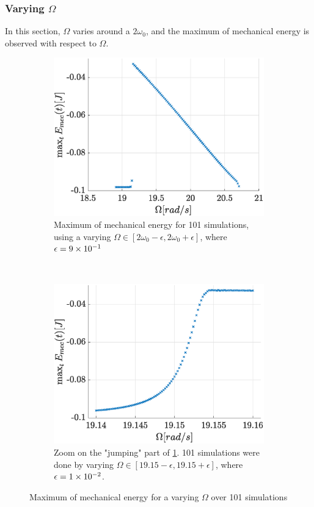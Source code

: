 \documentclass[a4paper,12pt,twoside]{article}
\begin{document}
\subsubsection{Varying $\Omega$}
In this section, $\Omega$ varies around a $2\omega_0$, and the maximum of mechanical energy is observed with respect to $\Omega$.

\begin{figure}[h]
	\begin{subfigure}[t]{0.49\textwidth}
		\includegraphics[width=\textwidth]{graphs/d_emax_full.eps}
		\caption{Maximum of mechanical energy for \num{101} simulations, using a varying $\Omega\in\left[2\omega_0 - \epsilon, 2\omega_0 + \epsilon\right]$, where $\epsilon = \num{9d-1}$}
		\label{fig:d-emax-full}
	\end{subfigure}
	~
	\begin{subfigure}[t]{0.49\textwidth}
		\includegraphics[width=\textwidth]{graphs/d_emax_close.eps}
		\caption{Zoom on the "jumping" part of \ref{fig:d-emax-full}. \num{101} simulations were done by varying $\Omega\in\left[\num{19.15} - \epsilon, \num{19.15} + \epsilon\right]$, where $\epsilon = \num{1d-2}$.}
		\label{fig:d-emax-close}
	\end{subfigure}
	\caption{Maximum of mechanical energy for a varying $\Omega$ over 101 simulations}
\end{figure}
\end{document}
